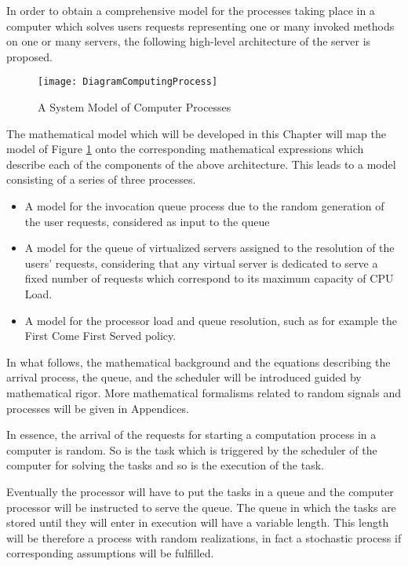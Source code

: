 In order to obtain a comprehensive model for the processes taking place in a computer which solves users requests representing  one or many invoked methods on one or many servers, the following high-level architecture  of the server is proposed.

\begin{figure}[htb!]
\texttt{[image: DiagramComputingProcess]}
\caption{A System Model of Computer Processes}
\label{fig:ControlModel_Queue_Scheduler}
\end{figure}

The mathematical model which will be developed in this Chapter will map the model of Figure \ref{fig:ControlModel_Queue_Scheduler} onto the corresponding mathematical expressions which describe each of the components of the above architecture. This leads to a model consisting of a series of three processes.

\begin{itemize}
\item A model for the invocation queue process due to the random generation of the user requests, considered as input to the queue
\item A model for the queue of virtualized servers assigned to the resolution of the users' requests, considering that any virtual server is dedicated to serve a fixed number of requests which correspond to its maximum capacity of CPU Load.
\item A model for the processor load and queue resolution, such as for example the First Come First Served policy.
\end{itemize}

In what follows, the mathematical background and the equations describing the arrival process, the queue, and the scheduler will be introduced guided by mathematical rigor. More mathematical formalisms related to random signals and processes will be given in Appendices.

In essence, the arrival of the requests for starting a computation process in a computer is random. So is the task which is triggered by the scheduler of the computer for solving the tasks and so is the execution of the task. 

Eventually the processor will have to put the tasks in a queue and the computer processor will be instructed to serve the queue. The queue in which the tasks are stored until they will enter in execution will have a variable length. This length will be therefore a process with random realizations, in fact a stochastic process if corresponding assumptions will be fulfilled. 

